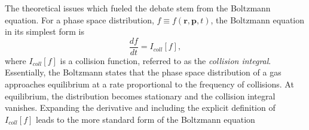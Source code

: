 \documentclass[%
 reprint,
 amsmath,amssymb,
 aps,
]{revtex4-1}
\begin{document}


The theoretical issues which fueled the debate stem from the Boltzmann equation. For a phase space distribution,  $f \equiv f\left(\mathbf{r},\mathbf{p},t\right)$, the Boltzmann equation in its simplest form is
\begin{equation}
\frac{df}{dt} = I_{coll}\left[f\right],
\end{equation}
where $I_{coll}\left[f\right]$ is a collision function, referred to as the \textit{collision integral}. Essentially, the Boltzmann states that the phase space distribution of a gas approaches equilibrium at a rate proportional to the frequency of collisions. At equilibrium, the distribution becomes stationary and the collision integral vanishes. Expanding the derivative and including the explicit definition of  $I_{coll}\left[f\right]$ leads to the more standard form of the Boltzmann equation

\end{document}
